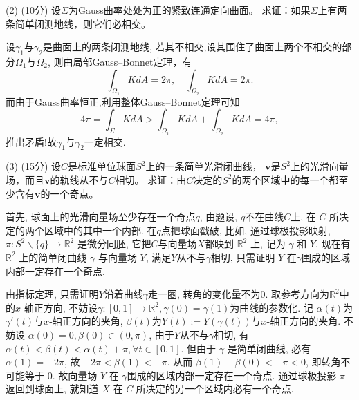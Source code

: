 \begin{itemize}
    (2) (10分) 设$\Sigma$为Gauss曲率处处为正的紧致连通定向曲面。
    求证：如果$\Sigma$上有两条简单闭测地线，则它们必相交。
    \begin{proofc}
        设$\gamma_{1}$与$\gamma_{2}$是曲面上的两条闭测地线,
        若其不相交,设其围住了曲面上两个不相交的部分$\Omega_{1}$与$\Omega_{2}$,
        则由局部Gauss--Bonnet定理，有
        $$
            \int_{\Omega_{1}}KdA=2\pi,\quad\int_{\Omega_{2}}KdA=2\pi.
        $$
        而由于Gauss曲率恒正,利用整体Gauss--Bonnet定理可知
        $$
            4\pi=\int_{\Sigma}KdA>\int_{\Omega_{1}}KdA+\int_{\Omega_{2}}KdA=4\pi,
        $$
        推出矛盾!故$\gamma_{1}$与$\gamma_{2}$一定相交.
    \end{proofc}
    (3) (15分) 设$C$是标准单位球面$S^2$上的一条简单光滑闭曲线，
    $\boldsymbol{v}$是$S^2$上的光滑向量场，而且$\boldsymbol{v}$的轨线从不与$C$相切。
    求证：由$C$决定的$S^2$的两个区域中的每一个都至少含有$\boldsymbol{v}$的一个奇点。
    \begin{proofc}
        首先, 球面上的光滑向量场至少存在一个奇点$q$, 由题设, $q$不在曲线$C$上, 在 $C$ 所决定的两个区域中的其中一个内部.
        在$q$点把球面戳破, 比如, 通过球极投影映射, $\pi \colon S^2\backslash \{q\} \to \mathbb{R}^2$ 是微分同胚, 它把$C$与向量场$X$都映到 $\mathbb{R}^2$ 上, 记为 $\gamma$ 和 $Y$.
        现在有 $\mathbb{R}^2$ 上的简单闭曲线 $\gamma$ 与向量场 $Y$, 满足$Y$从不与$\gamma$相切, 只需证明 $Y$ 在$\gamma$围成的区域内部一定存在一个奇点. 

        由指标定理, 只需证明$Y$沿着曲线$\gamma$走一圈, 转角的变化量不为$0$.
        取参考方向为$\mathbb{R}^2$中的$x$-轴正方向, 不妨设$\gamma \colon [0,1]\to \mathbb{R}^2, \gamma(0) = \gamma(1)$为曲线的参数化. 
        记 $\alpha(t)$为$\gamma'(t)$与$x$-轴正方向的夹角, $\beta(t)$为$Y(t) := Y(\gamma(t))$与$x$-轴正方向的夹角.
        不妨设 $\alpha(0) = 0, \beta(0)\in (0,\pi)$, 由于$Y$从不与$\gamma$相切, 有 $\alpha(t) < \beta(t) < \alpha(t) + \pi, \forall t\in [0,1]$.
        但由于 $\gamma$ 是简单闭曲线, 必有 $\alpha(1) = -2\pi$, 故 $ -2\pi < \beta(1) < -\pi$. 从而 $\beta(1) - \beta(0) < -\pi < 0$, 即转角不可能等于 $0$.
        故向量场 $Y$ 在 $\gamma$围成的区域内部一定存在一个奇点. 通过球极投影 $\pi$ 返回到球面上, 就知道 $X$ 在 $C$ 所决定的另一个区域内必有一个奇点.
    \end{proofc}
\end{itemize}